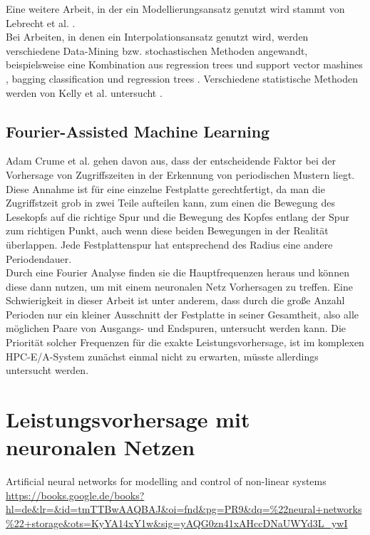 \documentclass[
	12pt,
	a4paper,
	BCOR10mm,
	DIV14,
	listof=totoc,
	bibliography=totoc,
	headsepline
]{scrreprt}
\begin{document}
	Eine weitere Arbeit, in der ein Modellierungsansatz genutzt wird stammt von Lebrecht et al. \cite{Lebrecht:2009:10.1109/QEST.2009.31}.\\ 
	Bei Arbeiten, in denen ein Interpolationsansatz genutzt wird, werden verschiedene Data-Mining bzw. stochastischen Methoden angewandt, beispielsweise eine Kombination aus regression trees und support vector mashines  \cite{Dai:2012:SDP:2477169.2477214}, bagging classification und regression trees \cite{DBLP:conf/npc/ZhangLZJC10}. Verschiedene statistische Methoden werden von Kelly et al. untersucht \cite{Kelly04inducingmodels}.\\

\subsection{Fourier-Assisted Machine Learning}
Adam Crume et al. \cite{Crume:2013:FML:2538542.2538561} gehen davon aus, dass der entscheidende Faktor bei der Vorhersage von Zugriffszeiten in der Erkennung von periodischen Mustern liegt. Diese Annahme ist für eine einzelne Festplatte gerechtfertigt, da man die Zugriffstzeit grob in zwei Teile aufteilen kann, zum einen die Bewegung des Lesekopfs auf die richtige Spur und die Bewegung des Kopfes entlang der Spur zum richtigen Punkt, auch wenn diese beiden Bewegungen in der Realität überlappen. Jede Festplattenspur hat entsprechend des Radius eine andere Periodendauer.\\
Durch eine Fourier Analyse finden sie die Hauptfrequenzen heraus und können diese dann nutzen, um mit einem neuronalen Netz Vorhersagen zu treffen.
Eine Schwierigkeit in dieser Arbeit ist unter anderem, dass durch die große Anzahl Perioden nur ein kleiner Ausschnitt der Festplatte in seiner Gesamtheit, also alle möglichen Paare von Ausgangs- und Endspuren, untersucht werden kann. Die Priorität solcher Frequenzen für die exakte Leistungsvorhersage, ist im komplexen HPC-E/A-System zunächst einmal nicht zu erwarten, müsste allerdings untersucht werden.

\section{Leistungsvorhersage mit neuronalen Netzen}
Artificial neural networks for modelling and control of non-linear systems
\url{https://books.google.de/books?hl=de&lr=&id=tmTTBwAAQBAJ&oi=fnd&pg=PR9&dq=%22neural+networks%22+storage&ots=KyYA14xY1w&sig=yAQG0zn41xAHccDNaUWYd3L_ywI}
\end{document}
